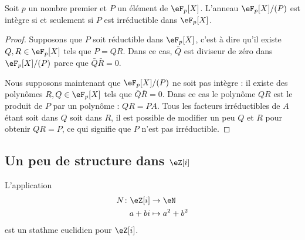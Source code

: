 \begin{proposition} \label{PropleGdaT}
    Soit \( p\) un nombre premier et \( P\) un élément de \( \eF_p[X]\). L'anneau \( \eF_p[X]/(P)\) est intègre si et seulement si \( P\) est irréductible dans \( \eF_p[X]\).
\end{proposition}

\begin{proof}
    Supposons que \( P\) soit réductible dans \( \eF_p[X]\), c'est à dire qu'il existe \( Q,R\in \eF_p[X]\) tels que \( P=QR\). Dans ce cas, \( \bar Q\) est diviseur de zéro dans \( \eF_p[X]/(P)\) parce que \( \bar Q\bar R=0\).

    Nous supposons maintenant que \( \eF_p[X]/(P)\) ne soit pas intègre : il existe des polynômes \( R,Q\in \eF_p[X]\) tels que \( \bar Q\bar R=0\). Dans ce cas le polynôme \( QR\) est le produit de \( P\) par un polynôme : \( QR=PA\). Tous les facteurs irréductibles de \( A \) étant soit dans \( Q\) soit dans \( R\), il est possible de modifier un peu \( Q\) et \( R\) pour obtenir \( QR=P\), ce qui signifie que \( P\) n'est pas irréductible.
\end{proof}

\subsection{Un peu de structure dans \texorpdfstring{$ \eZ[i]$}{Zi}}

\begin{lemma}   \label{LemSCAlICY}
     L'application
     \begin{equation}
         \begin{aligned}
             N\colon \eZ[i]&\to \eN \\
             a+bi&\mapsto a^2+b^2 
         \end{aligned}
     \end{equation}
     est un stathme euclidien pour \( \eZ[i]\).
\end{lemma}

